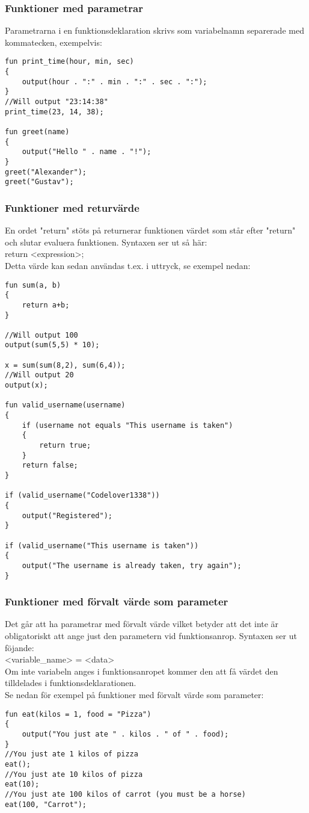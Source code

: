 \documentclass{TDP003mall}
\begin{document}
\subsubsection{Funktioner med parametrar}
Parametrarna i en funktionsdeklaration skrivs som variabelnamn separerade med kommatecken, exempelvis:
\begin{lstlisting}
fun print_time(hour, min, sec)
{
    output(hour . ":" . min . ":" . sec . ":");
}
//Will output "23:14:38"
print_time(23, 14, 38);

fun greet(name)
{
	output("Hello " . name . "!");
}
greet("Alexander");
greet("Gustav");
\end{lstlisting}

\subsubsection{Funktioner med returvärde}
En ordet "return" stöts på returnerar funktionen värdet som står efter "return" och slutar evaluera funktionen. Syntaxen ser ut så här:\\
return <expression>;
\\
Detta värde kan sedan användas t.ex. i uttryck, se exempel nedan:
\begin{lstlisting}
fun sum(a, b)
{
    return a+b;
}

//Will output 100
output(sum(5,5) * 10);

x = sum(sum(8,2), sum(6,4));
//Will output 20
output(x);

fun valid_username(username)
{
    if (username not equals "This username is taken")
    {
        return true;
    }
    return false;
}

if (valid_username("Codelover1338"))
{
    output("Registered");
}

if (valid_username("This username is taken"))
{
    output("The username is already taken, try again");
}
\end{lstlisting}

\subsubsection{Funktioner med förvalt värde som parameter}
Det går att ha parametrar med förvalt värde vilket betyder att det inte är obligatoriskt att ange just den parametern vid funktionsanrop. Syntaxen ser ut föjande:\\
<variable\_name> = <data>
\\
Om inte variabeln anges i funktionsanropet kommer den att få värdet den tilldelades i funktionsdeklarationen. 
\\
Se nedan för exempel på funktioner med förvalt värde som parameter:
\begin{lstlisting}
fun eat(kilos = 1, food = "Pizza")
{
	output("You just ate " . kilos . " of " . food);
}
//You just ate 1 kilos of pizza
eat();
//You just ate 10 kilos of pizza
eat(10);
//You just ate 100 kilos of carrot (you must be a horse)
eat(100, "Carrot");
\end{lstlisting}
\end{document}
